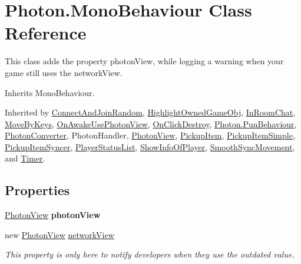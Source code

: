 \hypertarget{class_photon_1_1_mono_behaviour}{}\section{Photon.\+Mono\+Behaviour Class Reference}
\label{class_photon_1_1_mono_behaviour}


This class adds the property photon\+View, while logging a warning when your game still uses the network\+View.  




Inherits Mono\+Behaviour.



Inherited by \hyperlink{class_connect_and_join_random}{Connect\+And\+Join\+Random}, \hyperlink{class_highlight_owned_game_obj}{Highlight\+Owned\+Game\+Obj}, \hyperlink{class_in_room_chat}{In\+Room\+Chat}, \hyperlink{class_move_by_keys}{Move\+By\+Keys}, \hyperlink{class_on_awake_use_photon_view}{On\+Awake\+Use\+Photon\+View}, \hyperlink{class_on_click_destroy}{On\+Click\+Destroy}, \hyperlink{class_photon_1_1_pun_behaviour}{Photon.\+Pun\+Behaviour}, \hyperlink{class_photon_converter}{Photon\+Converter}, Photon\+Handler, \hyperlink{class_photon_view}{Photon\+View}, \hyperlink{class_pickup_item}{Pickup\+Item}, \hyperlink{class_pickup_item_simple}{Pickup\+Item\+Simple}, \hyperlink{class_pickup_item_syncer}{Pickup\+Item\+Syncer}, \hyperlink{class_player_status_list}{Player\+Status\+List}, \hyperlink{class_show_info_of_player}{Show\+Info\+Of\+Player}, \hyperlink{class_smooth_sync_movement}{Smooth\+Sync\+Movement}, and \hyperlink{class_timer}{Timer}.

\subsection*{Properties}
\begin{DoxyCompactItemize}
\item 
\hyperlink{class_photon_view}{Photon\+View} {\bfseries photon\+View}\hypertarget{class_photon_1_1_mono_behaviour_a27027ef7d8204896cb9381a200953892}{}\label{class_photon_1_1_mono_behaviour_a27027ef7d8204896cb9381a200953892}

\item 
new \hyperlink{class_photon_view}{Photon\+View} \hyperlink{class_photon_1_1_mono_behaviour_a00c97185c3a8594bf5c1c518a701706e}{network\+View}
\begin{DoxyCompactList}\small\item\em This property is only here to notify developers when they use the outdated value. \end{DoxyCompactList}\end{DoxyCompactItemize}


